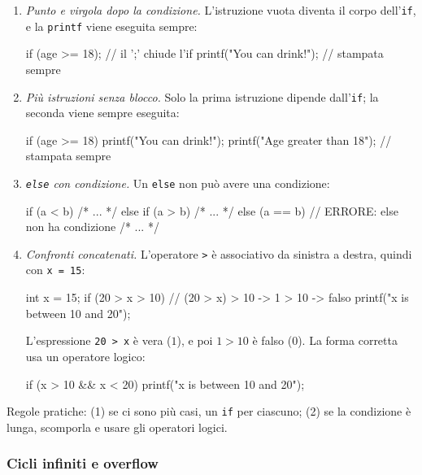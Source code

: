 \documentclass[11pt,a4paper]{article}
\begin{document}
\begin{enumerate}
    \item \emph{Punto e virgola dopo la condizione.} L'istruzione vuota diventa il corpo dell'\lstinline|if|, e la \lstinline|printf| viene eseguita sempre:
\begin{codice}
if (age >= 18);                       // il ';' chiude l'if
    printf("You can drink!\n");       // stampata sempre
\end{codice}
    \item \emph{Più istruzioni senza blocco.} Solo la prima istruzione dipende dall'\lstinline|if|; la seconda viene sempre eseguita:
\begin{codice}
if (age >= 18)
    printf("You can drink!\n");
    printf("Age greater than 18\n");  // stampata sempre
\end{codice}
    \item \emph{\lstinline|else| con condizione.} Un \lstinline|else| non può avere una condizione:
\begin{codice}
if (a < b)
    { /* ... */ }
else if (a > b)
    { /* ... */ }
else (a == b)                         // ERRORE: else non ha condizione
    { /* ... */ }
\end{codice}
    \item \emph{Confronti concatenati.} L'operatore \lstinline|>| è associativo da sinistra a destra, quindi con \lstinline|x = 15|:
\begin{codice}
int x = 15;
if (20 > x > 10)                      // (20 > x) > 10  ->  1 > 10  ->  falso
    printf("x is between 10 and 20");
\end{codice}
    L'espressione \lstinline|20 > x| è vera ($1$), e poi $1 > 10$ è falso ($0$). La forma corretta usa un operatore logico:
\begin{codice}
if (x > 10 && x < 20)
    printf("x is between 10 and 20");
\end{codice}
\end{enumerate}
Regole pratiche: (1) se ci sono più casi, un \lstinline|if| per ciascuno; (2) se la condizione è lunga, scomporla e usare gli operatori logici.

\subsubsection{Cicli infiniti e overflow}
\end{document}
